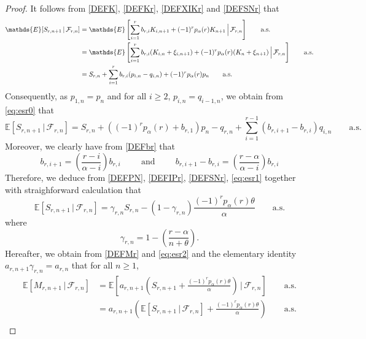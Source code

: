 \documentclass[twoside,12pt]{article}
\newcommand{\E}{\mathds{E}}
\begin{document}
\begin{proof}
It follows from \eqref{DEFK}, \eqref{DEFKr}, \eqref{DEFXIKr} and \eqref{DEFSNr} that
\begin{align}
\label{eq:esr0}
\E[S_{r,n+1}\,|\,\mathcal{F}_{r,n}]
&=\E\left[\sum_{i=1}^{r}b_{r,i}K_{i,n+1}+(-1)^r p_{\alpha}(r) K_{n+1}\,\Bigr|\,\mathcal{F}_{r,n}\right] \qquad \text{a.s.}
\notag\\
&=\E\left[\sum_{i=1}^{r}b_{r,i}(K_{i,n}+\xi_{i,n+1})+(-1)^r p_{\alpha}(r)(K_{n}+\xi_{n+1})\,\Bigr|\,\mathcal{F}_{r,n}\right]  \qquad \text{a.s.} \notag \\
&=S_{r,n}+ \sum_{i=1}^{r}b_{r,i}(p_{i,n}-q_{i,n}) + (-1)^rp_{\alpha}(r) p_{n}  \qquad \text{a.s.}
\end{align}
Consequently, as $p_{1,n}=p_n$ and for all $i \geq 2$, $p_{i,n}=q_{i-1,n}$, we obtain from \eqref{eq:esr0} that
\begin{equation}
\label{eq:esr1}
\E[S_{r,n+1}\,|\,\mathcal{F}_{r,n}]=S_{r,n}+((-1)^rp_{\alpha}(r)+b_{r,1})p_{n}-q_{r,n}+\sum_{i=1}^{r-1}(b_{r,i+1}-b_{r,i})q_{i,n}  \qquad \text{a.s.}
\end{equation}
Moreover, we clearly have from \eqref{DEFbr} that
\begin{equation*}
b_{r,i+1}= \left(\frac{r-i}{\alpha -i}\right)b_{r,i} \hspace{1cm} \text{and} \hspace{1cm} b_{r,i+1}-b_{r,i}= \left(\frac{r-\alpha}{\alpha -i}\right)b_{r,i}
\end{equation*}
Therefore, we deduce from \eqref{DEFPN}, \eqref{DEFIPr}, \eqref{DEFSNr}, \eqref{eq:esr1} together with straighforward calculation that
\begin{equation}
\label{eq:esr2}
\E[S_{r,n+1}\,|\,\mathcal{F}_{r,n}]=\gamma_{r,n}S_{r,n}-(1-\gamma_{r,n})\frac{(-1)^{r}p_{\alpha}(r) \theta}{\alpha}  \qquad \text{a.s.}
\end{equation}
where
\begin{displaymath}
\gamma_{r,n}=1-\left(\frac{r-\alpha}{n+\theta}\right).
\end{displaymath}
Hereafter, we obtain from \eqref{DEFMr} and \eqref{eq:esr2} and the elementary identity $a_{r,n+1}\gamma_{r,n}= a_{r,n}$
that for all $n\geq1$,
\begin{align*}
\E[M_{r,n+1}\,|\,\mathcal{F}_{r,n}]&=\E\left[a_{r,n+1}\left(S_{r,n+1}+\frac{(-1)^{r} p_{\alpha}(r) \theta}{\alpha}\right)\,\Bigr|\,\mathcal{F}_{r,n}\right] \qquad \text{a.s.}\\
&=a_{r,n+1}\left(\E[S_{r,n+1}\,|\,\mathcal{F}_{r,n}]+\frac{(-1)^{r} p_{\alpha}(r) \theta}{\alpha}\right) \qquad \text{a.s.}\\

\end{align*}
\end{proof}
\end{document}
